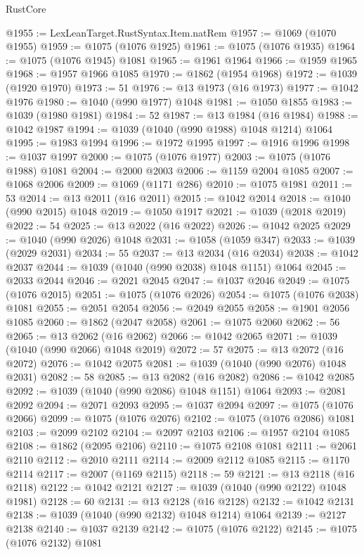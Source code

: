 \begin{lexlean}{RustCore}
\begin{coremodule}
@1955 := LexLeanTarget.RustSyntax.Item.natRem
@1957 := @1069 (@1070 @1955)
@1959 := @1075 (@1076 @1925)
@1961 := @1075 (@1076 @1935)
@1964 := @1075 (@1076 @1945) @1081
@1965 := @1961 @1964
@1966 := @1959 @1965
@1968 := @1957 @1966 @1085
@1970 := @1862 (@1954 @1968)
@1972 := @1039 (@1920 @1970)
@1973 := 51
@1976 := @13 @1973 (@16 @1973)
@1977 := @1042 @1976
@1980 := @1040 (@990 @1977) @1048
@1981 := @1050 @1855
@1983 := @1039 (@1980 @1981)
@1984 := 52
@1987 := @13 @1984 (@16 @1984)
@1988 := @1042 @1987
@1994 := @1039 (@1040 (@990 @1988) @1048 @1214) @1064
@1995 := @1983 @1994
@1996 := @1972 @1995
@1997 := @1916 @1996
@1998 := @1037 @1997
@2000 := @1075 (@1076 @1977)
@2003 := @1075 (@1076 @1988) @1081
@2004 := @2000 @2003
@2006 := @1159 @2004 @1085
@2007 := @1068 @2006
@2009 := @1069 (@1171 @286)
@2010 := @1075 @1981
@2011 := 53
@2014 := @13 @2011 (@16 @2011)
@2015 := @1042 @2014
@2018 := @1040 (@990 @2015) @1048
@2019 := @1050 @1917
@2021 := @1039 (@2018 @2019)
@2022 := 54
@2025 := @13 @2022 (@16 @2022)
@2026 := @1042 @2025
@2029 := @1040 (@990 @2026) @1048
@2031 := @1058 (@1059 @347)
@2033 := @1039 (@2029 @2031)
@2034 := 55
@2037 := @13 @2034 (@16 @2034)
@2038 := @1042 @2037
@2044 := @1039 (@1040 (@990 @2038) @1048 @1151) @1064
@2045 := @2033 @2044
@2046 := @2021 @2045
@2047 := @1037 @2046
@2049 := @1075 (@1076 @2015)
@2051 := @1075 (@1076 @2026)
@2054 := @1075 (@1076 @2038) @1081
@2055 := @2051 @2054
@2056 := @2049 @2055
@2058 := @1901 @2056 @1085
@2060 := @1862 (@2047 @2058)
@2061 := @1075 @2060
@2062 := 56
@2065 := @13 @2062 (@16 @2062)
@2066 := @1042 @2065
@2071 := @1039 (@1040 (@990 @2066) @1048 @2019)
@2072 := 57
@2075 := @13 @2072 (@16 @2072)
@2076 := @1042 @2075
@2081 := @1039 (@1040 (@990 @2076) @1048 @2031)
@2082 := 58
@2085 := @13 @2082 (@16 @2082)
@2086 := @1042 @2085
@2092 := @1039 (@1040 (@990 @2086) @1048 @1151) @1064
@2093 := @2081 @2092
@2094 := @2071 @2093
@2095 := @1037 @2094
@2097 := @1075 (@1076 @2066)
@2099 := @1075 (@1076 @2076)
@2102 := @1075 (@1076 @2086) @1081
@2103 := @2099 @2102
@2104 := @2097 @2103
@2106 := @1957 @2104 @1085
@2108 := @1862 (@2095 @2106)
@2110 := @1075 @2108 @1081
@2111 := @2061 @2110
@2112 := @2010 @2111
@2114 := @2009 @2112 @1085
@2115 := @1170 @2114
@2117 := @2007 (@1169 @2115)
@2118 := 59
@2121 := @13 @2118 (@16 @2118)
@2122 := @1042 @2121
@2127 := @1039 (@1040 (@990 @2122) @1048 @1981)
@2128 := 60
@2131 := @13 @2128 (@16 @2128)
@2132 := @1042 @2131
@2138 := @1039 (@1040 (@990 @2132) @1048 @1214) @1064
@2139 := @2127 @2138
@2140 := @1037 @2139
@2142 := @1075 (@1076 @2122)
@2145 := @1075 (@1076 @2132) @1081

\end{coremodule}
\end{lexlean}
